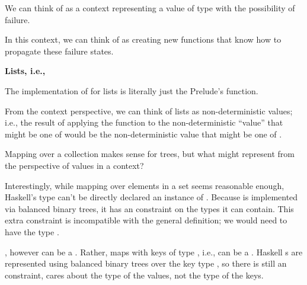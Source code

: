 \begin{notelist}
    \item \textbf{}
    \begin{notelist}
        \item We can think of  as a context representing a value of type  with the 
              possibility of failure.
        \item In this context, we can think of  as creating new functions that know how to
              propagate these failure states.
    \end{notelist}

    \item \textbf{Lists, i.e., \code{[]}}
    \begin{notelist}
        \item The implementation of  for lists is literally just the Prelude's  function.
        \item From the context perspective, we can think of lists as non-deterministic values; i.e., the
              result of applying the function  to the non-deterministic ``value'' that might be
              one of \code{[1, 2, 3]} would be the non-deterministic value that might be one of
              \code{[2, 4, 6]}.
    \end{notelist}

    \item \textbf{}
    \begin{notelist}
        \item Mapping over a collection makes sense for trees, but what might  represent from the perspective
              of values in a context?
        \item Interestingly, while mapping over elements in a set seems reasonable enough, Haskell's  type
              can't be directly declared an instance of . Because  is implemented via balanced
              binary trees, it has an  constraint on the types it can contain. This extra constraint is
              incompatible with the general  definition; we would need  to have the type
              .
        \item {}, however can be a . Rather, maps with keys of type , i.e., 
              can be a . Haskell s are represented using balanced binary trees over the
              key type , so there is still an  constraint,  cares about the type of
              the values, not the type of the keys.
    \end{notelist}


\end{notelist}
